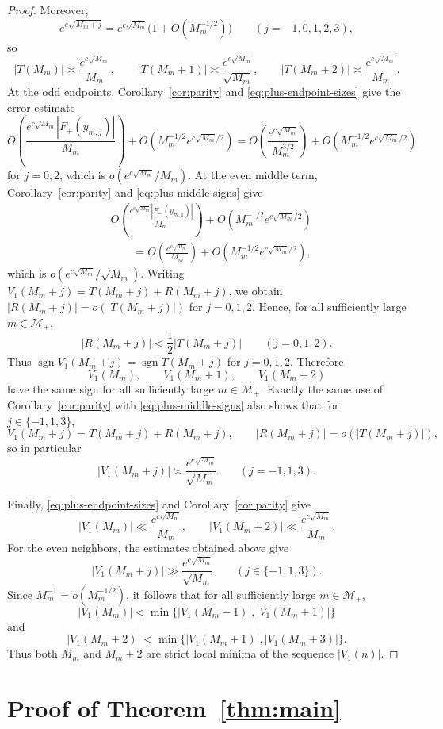 \documentclass[reqno]{amsart}
\theoremstyle{definition}
\theoremstyle{plain}
\theoremstyle{remark}
\numberwithin{equation}{section}
\newcommand{\sgn}{\operatorname{sgn}}
\begin{document}
\begin{proof}
Moreover,
\[
  e^{c\sqrt{M_m+j}}=e^{c\sqrt{M_m}}\bigl(1+O(M_m^{-1/2})\bigr)
  \qquad (j=-1,0,1,2,3),
\]
so
\[
  |T(M_m)|\asymp \frac{e^{c\sqrt{M_m}}}{M_m},
  \qquad
  |T(M_m+1)|\asymp \frac{e^{c\sqrt{M_m}}}{\sqrt{M_m}},
  \qquad
  |T(M_m+2)|\asymp \frac{e^{c\sqrt{M_m}}}{M_m}.
\]
At the odd endpoints, Corollary~\ref{cor:parity} and \eqref{eq:plus-endpoint-sizes} give the error estimate
\[
  O\!\left(\frac{e^{c\sqrt{M_m}}|F_+(y_{m,j})|}{M_m}\right)
  +O\!\left(M_m^{-1/2}e^{c\sqrt{M_m}/2}\right)
  =O\!\left(\frac{e^{c\sqrt{M_m}}}{M_m^{3/2}}\right)
   +O\!\left(M_m^{-1/2}e^{c\sqrt{M_m}/2}\right)
\]
for $j=0,2$, which is $o(e^{c\sqrt{M_m}}/M_m)$. At the even middle term, Corollary~\ref{cor:parity} and \eqref{eq:plus-middle-signs} give
\begin{align*}
  &O\!\left(\frac{e^{c\sqrt{M_m}}|F_-(y_{m,1})|}{M_m}\right)
   +O\!\left(M_m^{-1/2}e^{c\sqrt{M_m}/2}\right) \\
  &\qquad =O\!\left(\frac{e^{c\sqrt{M_m}}}{M_m}\right)
   +O\!\left(M_m^{-1/2}e^{c\sqrt{M_m}/2}\right),
\end{align*}
which is $o(e^{c\sqrt{M_m}}/\sqrt{M_m})$. Writing $V_1(M_m+j)=T(M_m+j)+R(M_m+j)$, we obtain $|R(M_m+j)|=o(|T(M_m+j)|)$ for $j=0,1,2$. Hence, for all sufficiently large $m\in\mathcal M_+$,
\[
  |R(M_m+j)|<\frac12|T(M_m+j)|\qquad (j=0,1,2).
\]
Thus $\sgn V_1(M_m+j)=\sgn T(M_m+j)$ for $j=0,1,2$. Therefore
\[
  V_1(M_m),\qquad V_1(M_m+1),\qquad V_1(M_m+2)
\]
have the same sign for all sufficiently large $m\in\mathcal M_+$. Exactly the same use of Corollary~\ref{cor:parity} with \eqref{eq:plus-middle-signs} also shows that for $j\in\{-1,1,3\}$,
\[
  V_1(M_m+j)=T(M_m+j)+R(M_m+j),
  \qquad
  |R(M_m+j)|=o(|T(M_m+j)|),
\]
so in particular
\[
  |V_1(M_m+j)|\asymp \frac{e^{c\sqrt{M_m}}}{\sqrt{M_m}}
  \qquad (j=-1,1,3).
\]

Finally, \eqref{eq:plus-endpoint-sizes} and Corollary~\ref{cor:parity} give
\[
  |V_1(M_m)|\ll \frac{e^{c\sqrt{M_m}}}{M_m},
  \qquad
  |V_1(M_m+2)|\ll \frac{e^{c\sqrt{M_m}}}{M_m}.
\]
For the even neighbors, the estimates obtained above give
\[
  |V_1(M_m+j)|\gg \frac{e^{c\sqrt{M_m}}}{\sqrt{M_m}}
  \qquad (j\in\{-1,1,3\}).
\]
Since $M_m^{-1}=o(M_m^{-1/2})$, it follows that for all sufficiently large $m\in\mathcal M_+$,
\[
  |V_1(M_m)|<\min\{|V_1(M_m-1)|,|V_1(M_m+1)|\}
\]
and
\[
  |V_1(M_m+2)|<\min\{|V_1(M_m+1)|,|V_1(M_m+3)|\}.
\]
Thus both $M_m$ and $M_m+2$ are strict local minima of the sequence $|V_1(n)|$.
\end{proof}

\section{Proof of Theorem~\ref{thm:main}}\label{sec:proof-thm-main}
\end{document}
